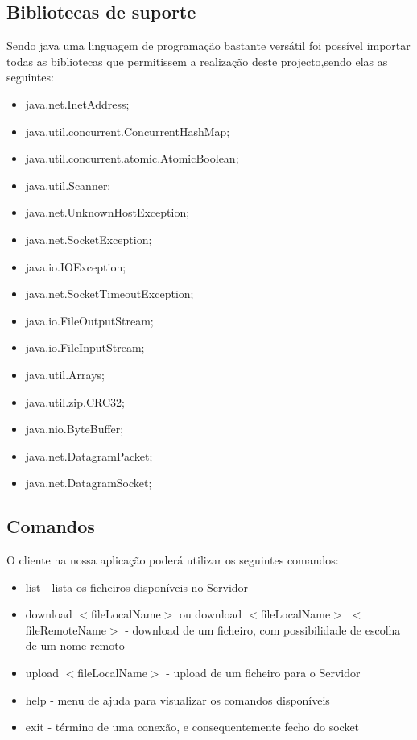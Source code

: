\documentclass{article}
\begin{document}
\subsection{Bibliotecas de suporte}

Sendo java uma linguagem de programação bastante versátil foi possível importar todas as bibliotecas que permitissem a realização 
deste projecto,sendo elas as seguintes:

\begin{itemize}
\item{java.net.InetAddress;}
\item{java.util.concurrent.ConcurrentHashMap;}
\item{java.util.concurrent.atomic.AtomicBoolean;}
\item{java.util.Scanner;}
\item{java.net.UnknownHostException;}
\item{java.net.SocketException;}
\item{java.io.IOException;}
\item{java.net.SocketTimeoutException;}
\item{java.io.FileOutputStream;}
\item{java.io.FileInputStream;}
\item{java.util.Arrays;}
\item{java.util.zip.CRC32;}
\item{java.nio.ByteBuffer;}
\item{java.net.DatagramPacket;}
\item{java.net.DatagramSocket;}
\end{itemize}
\subsection{Comandos}
O cliente na nossa aplicação poderá utilizar os seguintes comandos:
\begin{itemize}
\item list - lista os ficheiros disponíveis no Servidor
\item download $<$fileLocalName$>$ ou download $<$fileLocalName$>$ $<$fileRemoteName$>$ - download de um ficheiro, com possibilidade de escolha de um nome remoto
\item upload $<$fileLocalName$>$  - upload de um ficheiro para o Servidor
\item help - menu de ajuda para visualizar os comandos disponíveis
\item exit - término de uma conexão, e consequentemente fecho do socket
\end{itemize}
\newpage
\end{document}
